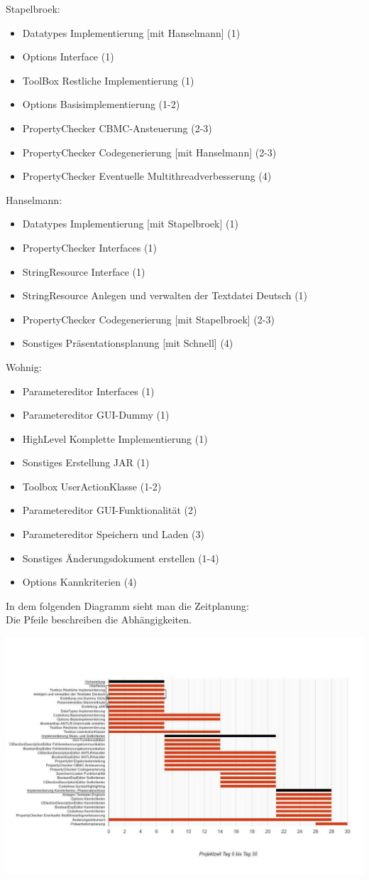 \documentclass[a4paper]{scrreprt}
\begin{document}
\vspace{8mm}
Stapelbroek:
\begin{itemize}
\item Datatypes Implementierung [mit Hanselmann] (1)
\item Options Interface (1)
\item ToolBox Restliche Implementierung (1)
\item Options Basisimplementierung (1-2)
\item PropertyChecker CBMC-Ansteuerung (2-3) 
\item PropertyChecker Codegenerierung [mit Hanselmann] (2-3) 
\item PropertyChecker Eventuelle Multithreadverbesserung (4)
\end{itemize}
\vspace{8mm}
Hanselmann:
\begin{itemize}
\item Datatypes Implementierung [mit Stapelbroek] (1)
\item PropertyChecker Interfaces (1)
\item StringResource Interface (1)
\item StringResource Anlegen und verwalten der Textdatei Deutsch (1)
\item PropertyChecker Codegenerierung [mit Stapelbroek] (2-3)
\item Sonstiges Präsentationsplanung [mit Schnell] (4)
\end{itemize}
\vspace{8mm}
Wohnig:
\begin{itemize}
\item Parametereditor Interfaces (1)
\item Parametereditor GUI-Dummy (1)
\item HighLevel Komplette Implementierung (1)
\item Sonstiges Erstellung JAR (1)
\item Toolbox UserActionKlasse (1-2)
\item Parametereditor GUI-Funktionalität (2)
\item Parametereditor Speichern und Laden (3)
\item Sonstiges Änderungsdokument erstellen (1-4)
\item Options Kannkriterien (4)
\end{itemize}
\vspace{8mm}
In dem folgenden Diagramm sieht man die Zeitplanung: \\
Die Pfeile beschreiben die Abhängigkeiten. \\
\begin{landscape}
\includegraphics[width=1.42\textwidth] {planung.jpg}
\end{landscape}
\end{document}
